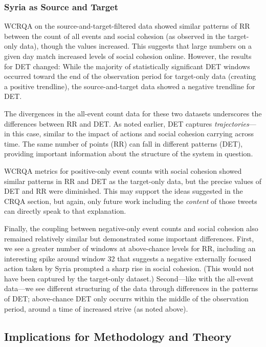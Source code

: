 \documentclass[
  english,
  man]{apa6}
\begin{document}
\hypertarget{syria-as-source-and-target-3}{%
\subsubsection{Syria as Source and Target}\label{syria-as-source-and-target-3}}

WCRQA on the source-and-target-filtered data showed similar patterns of RR
between the count of all events and social cohesion (as observed in the
target-only data), though the values increased. This suggests that large numbers
on a given day match increased levels of social cohesion online. However, the
results for DET changed: While the majority of statistically significant DET
windows occurred toward the end of the observation period for target-only data
(creating a positive trendline), the source-and-target data showed a negative
trendline for DET.

The divergences in the all-event count data for these two datasets underscores
the differences between RR and DET. As noted earlier, DET captures
\emph{trajectories}---in this case, similar to the impact of actions and social
cohesion carrying across time. The same number of points (RR) can fall in
different patterns (DET), providing important information about the structure of
the system in question.

WCRQA metrics for positive-only event counts with social cohesion showed similar
patterns in RR and DET as the target-only data, but the precise values of DET
and RR were diminished. This may support the ideas suggested in the CRQA
section, but again, only future work including the \emph{content} of those tweets can
directly speak to that explanation.

Finally, the coupling between negative-only event counts and social cohesion
also remained relatively similar but demonstrated some important differences.
First, we see a greater number of windows at above-chance levels for RR,
including an interesting spike around window 32 that suggests a negative
externally focused action taken by Syria prompted a sharp rise in social
cohesion. (This would not have been captured by the target-only dataset.)
Second---like with the all-event data---we see different structuring of the data
through differences in the patterns of DET; above-chance DET only occurrs within
the middle of the observation period, around a time of increased strive (as
noted above).

\hypertarget{implications-for-methodology-and-theory}{%
\subsection{Implications for Methodology and Theory}\label{implications-for-methodology-and-theory}}
\end{document}
